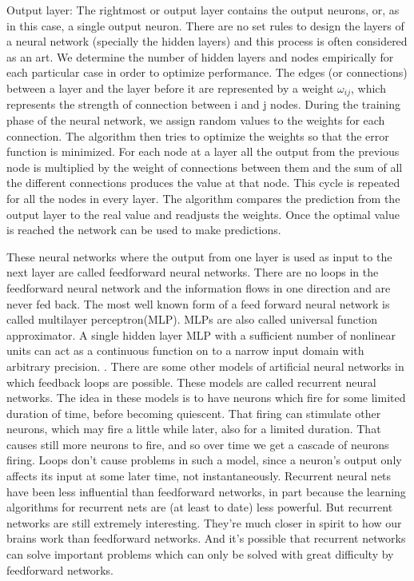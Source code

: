 Output layer: The rightmost or output layer contains the output neurons, or, as in this case, a single output neuron. 
There are no set rules to design the layers of a neural network (specially the hidden layers) and this process is often considered as an art\cite{NN}. We determine the number of hidden layers and nodes empirically for each particular case in order to optimize performance. The edges (or connections) between a layer and the layer before it are represented by a weight $\omega_{ij}$, which represents the strength of connection between i and j nodes. During the training phase of the neural network, we assign random values to the weights for each connection. The algorithm then tries to optimize the weights so that the error function is minimized. For each node at a layer all the output from the previous node is multiplied by the weight of connections between them and the sum of all the different connections produces the value at that node. This cycle is repeated for all the nodes in every layer. The algorithm compares the prediction from the output layer to the real value and readjusts the weights. Once the optimal value is reached the network can be used to make predictions\cite{hall199}.

These neural networks where the output from one layer is used as input to the next layer are called feedforward neural networks\cite{NN}\cite{hall199}. There are no loops in the feedforward neural network and the information flows in one direction and are never fed back. The most well known form of a feed forward neural network is called multilayer perceptron(MLP). MLPs are also called universal function approximator. A single hidden layer MLP with a sufficient number of nonlinear units can act as a continuous function on to a narrow input domain with arbitrary precision. \cite{Graves}.
There are some other models of artificial neural networks in which feedback loops are possible. These models are called recurrent neural networks. The idea in these models is to have neurons which fire for some limited duration of time, before becoming quiescent. That firing can stimulate other neurons, which may fire a little while later, also for a limited duration. That causes still more neurons to fire, and so over time we get a cascade of neurons firing. Loops don't cause problems in such a model, since a neuron's output only affects its input at some later time, not instantaneously. Recurrent neural nets have been less influential than feedforward networks, in part because the learning algorithms for recurrent nets are (at least to date) less powerful. But recurrent networks are still extremely interesting. They're much closer in spirit to how our brains work than feedforward networks. And it's possible that recurrent networks can solve important problems which can only be solved with great difficulty by feedforward networks.\cite{NN} %



